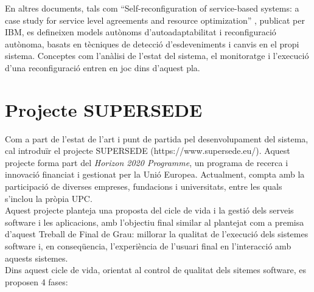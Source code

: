 En altres documents, tals com “Self-reconfiguration of service-based systems: a case study for service level agreements and resource optimization” , publicat per IBM, es defineixen models autònoms d’autoadaptabilitat i reconfiguració autònoma, basats en tècniques de detecció d’esdeveniments i canvis en el propi sistema. Conceptes com l’anàlisi de l’estat del sistema, el monitoratge i l’execució d’una reconfiguració entren en joc dins d’aquest pla.


\section{Projecte SUPERSEDE}

Com a part de l'estat de l'art i punt de partida pel desenvolupament del sistema, cal introduïr el projecte SUPERSEDE (https://www.supersede.eu/). Aquest projecte forma part del \textit{Horizon 2020 Programme}, un programa de recerca i innovació financiat i gestionat per la Unió Europea. Actualment, compta amb la participació de diverses empreses, fundacions i universitats, entre les quals s'inclou la pròpia UPC. \\

Aquest projecte planteja una proposta del cicle de vida i la gestió dels serveis software i les aplicacions, amb l'objectiu final similar al plantejat com a premisa d'aquest Treball de Final de Grau: millorar la qualitat de l'execució dels sistemes software i, en conseqüencia, l'experiència de l'usuari final en l'interacció amb aquests sistemes. \\

Dins aquest cicle de vida, orientat al control de qualitat dels sitemes software, es proposen 4 fases:

